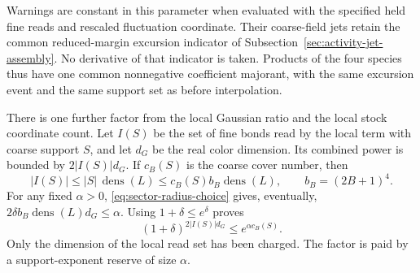 Warnings are constant in this parameter when evaluated with the
specified held fine reads and rescaled fluctuation coordinate.
Their coarse-field jets retain the common reduced-margin excursion
indicator of Subsection~\ref{sec:activity-jet-assembly}. No derivative
of that indicator is taken. Products of the four species thus have
one common nonnegative coefficient majorant, with the same
excursion event and the same support set as before interpolation.

There is one further factor from the local Gaussian ratio and the
local stock coordinate count. Let $I(S)$ be the set of fine bonds
read by the local term with coarse support $S$, and let $d_G$ be
the real color dimension. Its combined power is bounded by
$2|I(S)|d_G$. If $c_B(S)$ is the coarse cover number, then
\[
 |I(S)|\le |S|\,\operatorname{dens}(L)
       \le c_B(S)b_B\operatorname{dens}(L),
                         \qquad b_B=(2B+1)^4.
\]
For any fixed $\alpha>0$, \eqref{eq:sector-radius-choice} gives,
eventually,
$2\delta b_B\operatorname{dens}(L)d_G\le\alpha$.
Using $1+\delta\le e^\delta$ proves
\begin{equation}\label{eq:sector-local-dimension}
                 (1+\delta)^{2|I(S)|d_G}
                                   \le e^{\alpha c_B(S)}.
\end{equation}
Only the dimension of the local read set has been charged.
The factor is paid by a support-exponent reserve of size $\alpha$.

